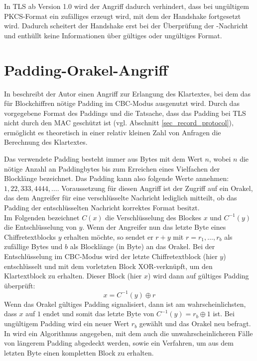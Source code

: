 In TLS ab Version 1.0 wird der Angriff dadurch verhindert, dass bei ungültigem PKCS-Format ein zufälliges \premastersecret{} erzeugt wird, mit dem der Handshake fortgesetzt wird. Dadurch scheitert der Handshake erst bei der Überprüfung der \finished{}-Nachricht und enthüllt keine Informationen über gültiges oder ungültiges Format.

\section{Padding-Orakel-Angriff}
\label{sec_attack_padding_oracle}

In \cite{vaudenay02} beschreibt der Autor einen Angriff zur Erlangung des Klartextes, bei dem das für Blockchiffren nötige Padding im CBC-Modus ausgenutzt wird. Durch das vorgegebene Format des Paddings und die Tatsache, dass das Padding bei TLS nicht durch den MAC geschützt ist (vgl. Abschnitt \ref{sec_record_protocol}), ermöglicht es theoretisch in einer relativ kleinen Zahl von Anfragen die Berechnung des Klartextes.

Das verwendete Padding besteht immer aus Bytes mit dem Wert \(n\), wobei \(n\) die nötige Anzahl an Paddingbytes bis zum Erreichen eines Vielfachen der Blocklänge bezeichnet. Das Padding kann also folgende Werte annehmen: \(1, 22, 333, 4444, \dots\). Voraussetzung für diesen Angriff ist der Zugriff auf ein Orakel, das dem Angreifer für eine verschlüsselte Nachricht lediglich mitteilt, ob das Padding der entschlüsselten Nachricht korrektes Format besitzt. \\
Im Folgenden bezeichnet \(C(x)\) die Verschlüsselung des Blockes \(x\) und \(C^{-1}(y)\) die Entschlüsselung von \(y\). Wenn der Angreifer nun das letzte Byte eines Chiffretextblocks \(y\) erhalten möchte, so sendet er \(r + y\) mit \(r = r_1,  \dots , r_b\) als zufällige Bytes und \(b\) als Blocklänge (in Byte) an das Orakel. Bei der Entschlüsselung im CBC-Modus wird der letzte Chiffretextblock (hier \(y\)) entschlüsselt und mit dem vorletzten Block XOR-verknüpft, um den Klartextblock zu erhalten. Dieser Block (hier \(x\)) wird dann auf gültiges Padding überprüft:
\[x=C^{-1}(y) \oplus r\]
Wenn das Orakel gültiges Padding signalisiert, dann ist am wahrscheinlichsten, dass \(x\) auf \(1\) endet und somit das letzte Byte von \(C^{-1}(y)= r_b \oplus 1\) ist. Bei ungültigem Padding wird ein neuer Wert \(r_b\) gewählt und das Orakel neu befragt.\\
In \cite{vaudenay02} wird ein Algorithmus angegeben, mit dem auch die unwahrscheinlicheren Fälle von längerem Padding abgedeckt werden, sowie ein Verfahren, um aus dem letzten Byte einen kompletten Block zu erhalten. 

